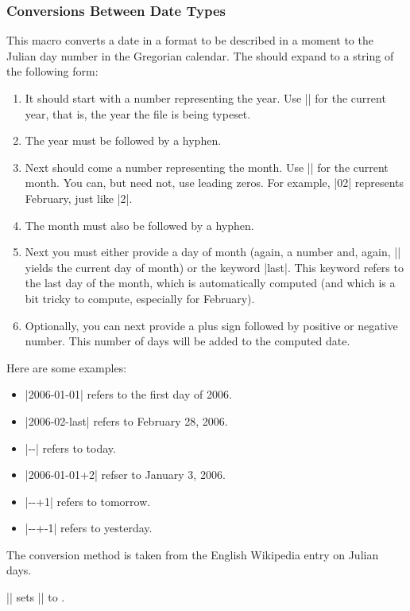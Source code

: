 \subsubsection{Conversions Between Date Types}

\begin{command}{\pgfcalendardatetojulian{}}
  This macro converts a date in a format to be described in a moment
  to the Julian day number in the Gregorian calendar. The 
  should expand to a string of the following form:
  \begin{enumerate}\label{calendar-date-format}
  \item It should start with a number representing the year. Use
    |\year| for the current year, that is, the year the file is being
    typeset.
  \item The year must be followed by a hyphen.
  \item Next should come a number representing the month. Use |\month|
    for the current month. You can, but need not, use leading
    zeros. For example, |02| represents February, just like |2|.
  \item The month must also be followed by a hyphen.
  \item Next you must either provide a day of month (again, a number
    and, again, |\day| yields the current day of month) or the keyword
    |last|. This keyword refers to the last day of the month, which is
    automatically computed (and which is a bit tricky to compute,
    especially for February).
  \item Optionally, you can next provide a plus sign followed by
    positive or negative number. This number of days will be added to
    the computed date.
  \end{enumerate}

  Here are some examples:
  \begin{itemize}
  \item |2006-01-01| refers to the first day of 2006.
  \item |2006-02-last| refers to February 28, 2006.
  \item |\year-\month-\day| refers to today.
  \item |2006-01-01+2| refser to January 3, 2006.
  \item |\year-\month-\day+1| refers to tomorrow.
  \item |\year-\month-\day+-1| refers to yesterday.
  \end{itemize}
  
  The conversion method is taken from the English Wikipedia entry on
  Julian days. 

  \newcount\mycount
  \example || sets
  |\mycount| to
  \the\mycount.

  
\end{command}

